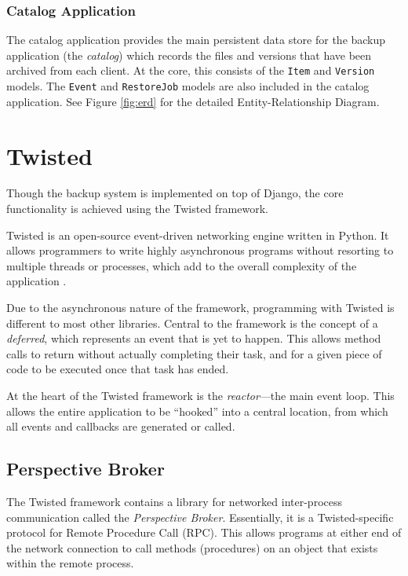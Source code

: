 \subsubsection{Catalog Application}

The catalog application provides the main persistent data store for the backup
application (the \emph{catalog}) which records the files and versions that have
been archived from each client. At the core, this consists of the \verb!Item!
and \verb!Version! models. The \verb!Event! and \verb!RestoreJob! models are
also included in the catalog application. See Figure \ref{fig:erd} for the
detailed Entity-Relationship Diagram.

\section{Twisted}

Though the backup system is implemented on top of Django, the core
functionality is achieved using the Twisted framework.

Twisted is an open-source event-driven networking engine written in Python. It
allows programmers to write highly asynchronous programs without resorting to
multiple threads or processes, which add to the overall complexity of the
application \cite{kinder2005}.

Due to the asynchronous nature of the framework, programming with Twisted is
different to most other libraries. Central to the framework is the concept of
a \emph{deferred}, which represents an event that is yet to happen. This allows
method calls to return without actually completing their task, and for a given
piece of code to be executed once that task has ended.

At the heart of the Twisted framework is the \emph{reactor}---the main event
loop. This allows the entire application to be ``hooked'' into a central
location, from which all events and callbacks are generated or called.

\subsection{Perspective Broker}

The Twisted framework contains a library for networked inter-process
communication called the \emph{Perspective Broker}. Essentially, it is
a Twisted-specific protocol for Remote Procedure Call (RPC). This allows
programs at either end of the network connection to call methods (procedures)
on an object that exists within the remote process. \cite{lefkowitz2003}

